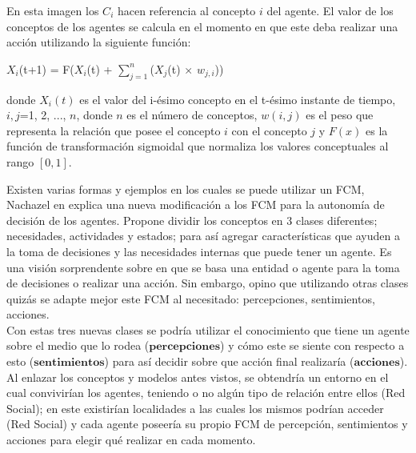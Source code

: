 En esta imagen los $C_{i}$ hacen referencia al concepto $i$ del agente. El valor de los conceptos de los agentes se 
calcula en el momento en que este deba realizar una acción utilizando la siguiente función:
\begin{center}
    $X_{i}$(t+1) = F($X_{i}$(t) + $\sum_{j=1}^{n}${($X_{j}$(t) $\times$ $w_{j,i}$)})
\end{center}

donde $X_{i} (t)$ es el valor del i-ésimo concepto en el t-ésimo instante de tiempo, $i,j$=1, 2, ..., $n$, donde $n$ es el número
de conceptos, $w(i,j)$ es el peso que representa la relación que posee el concepto $i$ con el concepto $j$ y $F(x)$ es la función 
de transformación sigmoidal que normaliza los valores conceptuales al rango $[0,1]$. \autocite{Poczeta2020}

Existen varias formas y ejemplos en los cuales se puede utilizar un FCM, Nachazel en \autocite{Nachazel2021}
explica una nueva modificación a los FCM para la autonomía de decisión de los agentes. Propone dividir los conceptos en 3 clases
diferentes; necesidades, actividades y estados; para así agregar características que ayuden a la toma de decisiones y las necesidades 
internas que puede tener un agente. Es una visión sorprendente sobre en que se basa una entidad
o agente para la toma de decisiones o realizar una acción. Sin embargo, opino que utilizando otras clases quizás
se adapte mejor este FCM al necesitado: percepciones, sentimientos, acciones.\\ 
Con estas tres nuevas clases se podría utilizar el conocimiento que tiene un agente sobre el medio que lo rodea ($\textbf{percepciones}$) y  
cómo este se siente con respecto a esto ($\textbf{sentimientos}$) para así decidir sobre que acción final realizaría ($\textbf{acciones}$).\\

Al enlazar los conceptos y modelos antes vistos, se obtendría un entorno en el cual convivirían los agentes, teniendo o no algún
tipo de relación entre ellos (Red Social); en este existirían localidades a las cuales los mismos podrían acceder (Red Social) y 
cada agente poseería su propio FCM de percepción, sentimientos y acciones para elegir qué realizar en cada momento.